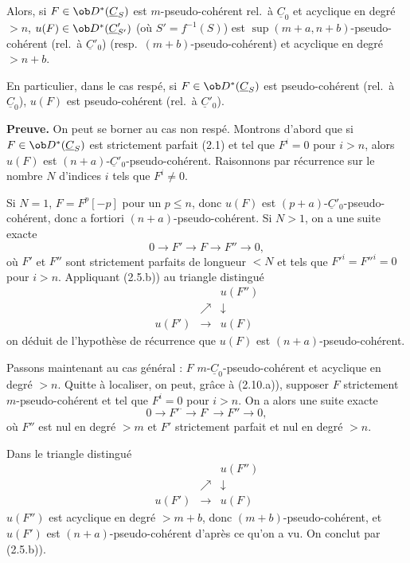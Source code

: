 Alors, si $F \in \ob D^*(\underline{C}_S)$ est $m$-pseudo-cohérent rel.\ à $\underline{C}_0$ et acyclique en degré $> n$, $u(F) \in \ob D^*(\underline{C}'_{S'})$ (où $S' = f^{-1}(S)$) est $\sup(m+a, n+b)$-pseudo-cohérent (rel.\ à $\underline{C}'_0$) (resp.\ $(m+b)$-pseudo-cohérent) et acyclique en degré $> n+b$.

En particulier, dans le cas respé, si $F \in \ob D^*(\underline{C}_S)$ est pseudo-cohérent (rel.\ à $\underline{C}_0$), $u(F)$ est pseudo-cohérent (rel.\ à $\underline{C}'_0$).

\textbf{Preuve.} On peut se borner au cas non respé. Montrons d'abord que si $F \in \ob D^*(\underline{C}_S)$ est strictement parfait (2.1) et tel que $F^i = 0$ pour $i > n$, alors $u(F)$ est $(n+a)$-$\underline{C}'_0$-pseudo-cohérent. Raisonnons par récurrence sur le nombre $N$ d'indices $i$ tels que $F^i \neq 0$.

Si $N = 1$, $F = F^p[-p]$ pour un $p \leqslant n$, donc $u(F)$ est $(p+a)$-$\underline{C}'_0$-pseudo-cohérent, donc a fortiori $(n+a)$-pseudo-cohérent. Si $N > 1$, on a une suite exacte
\[
0 \longrightarrow F' \longrightarrow F \longrightarrow F'' \longrightarrow 0,
\]
où $F'$ et $F''$ sont strictement parfaits de longueur $< N$ et tels que $F'^i = F''^i = 0$ pour $i > n$. Appliquant (2.5.b)) au triangle distingué
\[
\begin{array}{ccc}
& & u(F'') \\
& \nearrow & \downarrow \\
u(F') & \longrightarrow & u(F)
\end{array}
\]
on déduit de l'hypothèse de récurrence que $u(F)$ est $(n+a)$-pseudo-cohérent.

Passons maintenant au cas général : $F$ $m$-$\underline{C}_0$-pseudo-cohérent et acyclique en degré $> n$. Quitte à localiser, on peut, grâce à (2.10.a)), supposer $F$ strictement $m$-pseudo-cohérent et tel que $F^i = 0$ pour $i > n$. On a alors une suite exacte
\[
0 \longrightarrow F'^\cdot \longrightarrow F^\cdot \longrightarrow F'' \longrightarrow 0,
\]
où $F''$ est nul en degré $> m$ et $F'$ strictement parfait et nul en degré $> n$.

Dans le triangle distingué
\[
\begin{array}{ccc}
& & u(F'') \\
& \nearrow & \downarrow \\
u(F') & \longrightarrow & u(F)
\end{array}
\]
$u(F'')$ est acyclique en degré $> m+b$, donc $(m+b)$-pseudo-cohérent, et $u(F')$ est $(n+a)$-pseudo-cohérent d'après ce qu'on a vu. On conclut par (2.5.b)).

